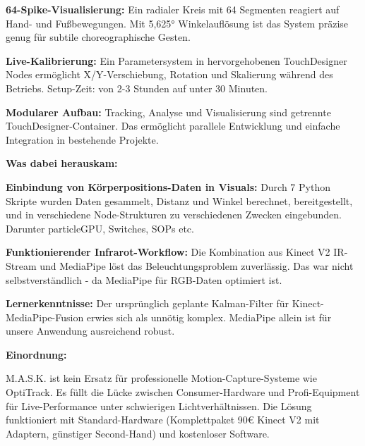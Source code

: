 \textbf{64-Spike-Visualisierung:}
Ein radialer Kreis mit 64 Segmenten reagiert auf Hand- und Fußbewegungen. Mit 5,625° Winkelauflösung ist das System präzise genug für subtile choreographische Gesten.

\textbf{Live-Kalibrierung:}
Ein Parametersystem in hervorgehobenen TouchDesigner Nodes ermöglicht X/Y-Verschiebung, Rotation und Skalierung während des Betriebs. Setup-Zeit: von 2-3 Stunden auf unter 30 Minuten.

\textbf{Modularer Aufbau:}
Tracking, Analyse und Visualisierung sind getrennte TouchDesigner-Container. Das ermöglicht parallele Entwicklung und einfache Integration in bestehende Projekte.

\textbf{Was dabei herauskam:}

\textbf{Einbindung von Körperpositions-Daten in Visuals:}
Durch 7 Python Skripte wurden Daten gesammelt, Distanz und Winkel berechnet, bereitgestellt, und in verschiedene Node-Strukturen zu verschiedenen Zwecken eingebunden. Darunter particleGPU, Switches, SOPs etc.

\textbf{Funktionierender Infrarot-Workflow:}
Die Kombination aus Kinect V2 IR-Stream und MediaPipe löst das Beleuchtungsproblem zuverlässig. Das war nicht selbstverständlich - da MediaPipe für RGB-Daten optimiert ist.

\textbf{Lernerkenntnisse:}
Der ursprünglich geplante Kalman-Filter für Kinect-MediaPipe-Fusion erwies sich als unnötig komplex. MediaPipe allein ist für unsere Anwendung ausreichend robust.

\textbf{Einordnung:}

M.A.S.K. ist kein Ersatz für professionelle Motion-Capture-Systeme wie OptiTrack. Es füllt die Lücke zwischen Consumer-Hardware und Profi-Equipment für Live-Performance unter schwierigen Lichtverhältnissen. Die Lösung funktioniert mit Standard-Hardware (Komplettpaket 90€ Kinect V2 mit Adaptern, günstiger Second-Hand) und kostenloser Software.